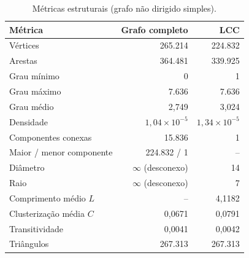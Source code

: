 \begin{table}[t]
  \caption{Métricas estruturais (grafo não dirigido simples).}
  \label{tab:parte1}
\small
\begin{tabular}{lrr}
  \toprule
  Métrica & Grafo completo & LCC \\
  \midrule
  Vértices & 265.214 & 224.832 \\
  Arestas & 364.481 & 339.925 \\
  Grau mínimo & 0 & 1 \\
  Grau máximo & 7.636 & 7.636 \\
  Grau médio & 2,749 & 3,024 \\
  Densidade & $1{,}04\times10^{-5}$ & $1{,}34\times10^{-5}$ \\
  Componentes conexas & 15.836 & 1 \\
  Maior / menor componente & 224.832 / 1 & -- \\
  Diâmetro & $\infty$ (desconexo) & 14 \\
  Raio & $\infty$ (desconexo) & 7 \\
  Comprimento médio $L$ & -- & 4,1182 \\
  Clusterização média $C$ & 0,0671 & 0,0791 \\
  Transitividade & 0,0041 & 0,0042 \\
  Triângulos & 267.313 & 267.313 \\
  \bottomrule
\end{tabular}
\end{table}
